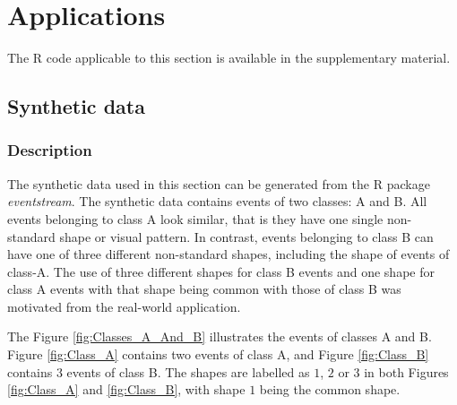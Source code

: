 \documentclass[11pt]{article}
\begin{document}
	\section{Applications} \label{sec:Experiments}
	The R code applicable to this section is available in the supplementary material.
	\subsection{Synthetic data}
	\subsubsection{Description}
 	The synthetic data used in this section can be generated from the R package {\it eventstream}. The synthetic data contains events of two classes: A and B. All events belonging to class A look similar, that is they have one single non-standard shape or visual pattern. In contrast, events belonging to class B  can have one of three different non-standard shapes, including the shape of events of class-A. The use of three different shapes for class B events and one shape for class A events with that shape being common with those of class B was motivated from the real-world application. 
 	
 	The Figure \ref{fig:Classes_A_And_B} illustrates the events of classes A and B.  Figure \ref{fig:Class_A} contains two events of class A, and Figure \ref{fig:Class_B} contains 3 events of class B. The shapes are labelled as $1$, $2$ or $3$ in both Figures \ref{fig:Class_A} and \ref{fig:Class_B}, with shape $1$ being the common shape.
  
   
\end{document}
